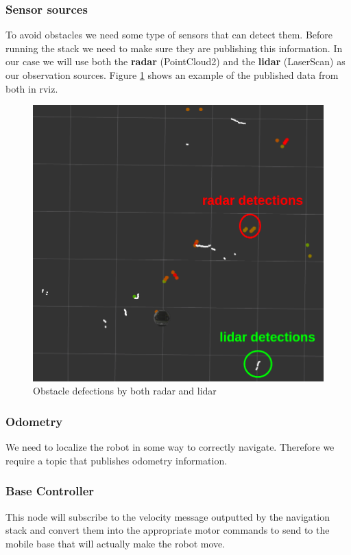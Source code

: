 \documentclass[12pt]{article}
\begin{document}
\subsubsection{Sensor sources}
To avoid obstacles we need some type of sensors that can detect them. Before running the stack we need to make sure they are publishing this information.
In our case we will use both the \textbf{radar} (PointCloud2) and the \textbf{lidar} (LaserScan) as our observation sources.
Figure \ref{fig:sensors} shows an example of the published data from both in rviz.
\begin{figure}[!htb]
    \centering
    \includegraphics[scale=0.3]{sensors2.png}
    \caption{Obstacle defections by both radar and lidar}
    \label{fig:sensors}
\end{figure}
\subsubsection{Odometry}
We need to localize the robot in some way to correctly navigate. Therefore we require a topic that publishes odometry information.
\subsubsection{Base Controller}
This node will subscribe to the velocity message outputted by the navigation stack and convert them into the appropriate motor commands to send to the mobile base that will actually make the robot move.
\end{document}
